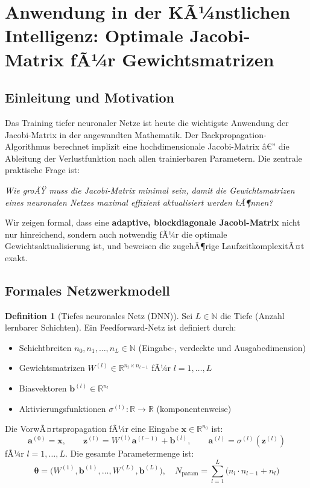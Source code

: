 ﻿\documentclass[a4paper,12pt]{article}
\theoremstyle{definition}
\newtheorem{definition}{Definition}
\begin{document}
\newpage
\section{Anwendung in der KÃ¼nstlichen Intelligenz: Optimale Jacobi-Matrix fÃ¼r Gewichtsmatrizen}

\subsection{Einleitung und Motivation}

Das Training tiefer neuronaler Netze ist heute die wichtigste Anwendung der Jacobi-Matrix in der angewandten Mathematik. Der Backpropagation-Algorithmus berechnet implizit eine hochdimensionale Jacobi-Matrix â€” die Ableitung der Verlustfunktion nach allen trainierbaren Parametern. Die zentrale praktische Frage ist:

\begin{center}
\textit{Wie groÃŸ muss die Jacobi-Matrix minimal sein, damit die Gewichtsmatrizen eines neuronalen Netzes maximal effizient aktualisiert werden kÃ¶nnen?}
\end{center}

Wir zeigen formal, dass eine \textbf{adaptive, blockdiagonale Jacobi-Matrix} nicht nur hinreichend, sondern auch notwendig fÃ¼r die optimale Gewichtsaktualisierung ist, und beweisen die zugehÃ¶rige LaufzeitkomplexitÃ¤t exakt.

\subsection{Formales Netzwerkmodell}

\begin{definition}[Tiefes neuronales Netz (DNN)]
	\label{def:dnn}
	Sei $L \in \mathbb{N}$ die Tiefe (Anzahl lernbarer Schichten). Ein Feedforward-Netz ist definiert durch:
	\begin{itemize}
		\item Schichtbreiten $n_0, n_1, \ldots, n_L \in \mathbb{N}$ (Eingabe-, verdeckte und Ausgabedimension)
		\item Gewichtsmatrizen $W^{(l)} \in \mathbb{R}^{n_l \times n_{l-1}}$ fÃ¼r $l = 1, \ldots, L$
		\item Biasvektoren $\boldsymbol{b}^{(l)} \in \mathbb{R}^{n_l}$
		\item Aktivierungsfunktionen $\sigma^{(l)}: \mathbb{R} \to \mathbb{R}$ (komponentenweise)
	\end{itemize}
	Die VorwÃ¤rtspropagation fÃ¼r eine Eingabe $\boldsymbol{x} \in \mathbb{R}^{n_0}$ ist:
	\[
	\boldsymbol{a}^{(0)} = \boldsymbol{x}, \qquad
	\boldsymbol{z}^{(l)} = W^{(l)} \boldsymbol{a}^{(l-1)} + \boldsymbol{b}^{(l)}, \qquad
	\boldsymbol{a}^{(l)} = \sigma^{(l)}(\boldsymbol{z}^{(l)})
	\]
	fÃ¼r $l = 1, \ldots, L$. Die gesamte Parametermenge ist:
	\[
	\boldsymbol{\theta} = \bigl(W^{(1)}, \boldsymbol{b}^{(1)}, \ldots, W^{(L)}, \boldsymbol{b}^{(L)}\bigr),
	\quad
	N_{\mathrm{param}} = \sum_{l=1}^L \bigl(n_l \cdot n_{l-1} + n_l\bigr)
	\]
\end{definition}
\end{document}
